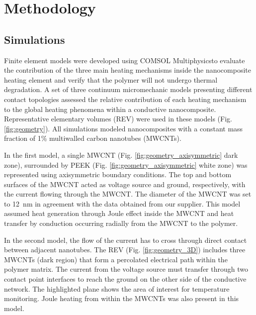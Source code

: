 \documentclass[11pt,review,times]{elsarticle}
\begin{document}
							\section{Methodology}

\subsection{Simulations}

Finite element models were developed using COMSOL Mul\-ti\-phy\-sics\-\textregistered to evaluate the contribution of the three main heating mechanisms inside the nanocomposite heating element and verify that the polymer will not undergo thermal degradation.  
A set of three continuum micromechanic models presenting different contact topologies assessed the relative contribution of each heating mechanism to the global heating phenomena within a conductive nanocomposite. 
Representative elementary volumes (REV) were used in these models (Fig. \ref{fig:geometry}). 
All simulations modeled nanocomposites with a constant mass fraction of 1\% multiwalled carbon nanotubes (MWCNTs). 

In the first model, a single MWCNT (Fig. \ref{fig:geometry_axisymmetric} dark zone), surrounded by PEEK (Fig. \ref{fig:geometry_axisymmetric} white zone) was represented using axisymmetric boundary conditions. 
The top and bottom surfaces of the MWCNT acted as voltage source and ground, respectively, with the current flowing through the MWCNT. 
The diameter of the MWCNT was set to \SI{12}{\nano\metre} in agreement with the data obtained from our supplier. 
This model assumed heat generation through Joule effect inside the MWCNT and heat transfer by conduction occurring radially from the MWCNT to the polymer.

In the second model, the flow of the current has to cross through direct contact between adjacent nanotubes. 
The REV (Fig. \ref{fig:geometry_3D}) includes three MWCNTs (dark region) that form a percolated electrical path within the polymer matrix. 
The current from the voltage source must transfer through two contact point interfaces to reach the ground on the other side of the conductive network. 
The highlighted plane shows the area of interest for temperature monitoring. 
Joule heating from within the MWCNTs was also present in this model. 
\end{document}
